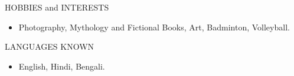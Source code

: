 \documentclass{resume} %
\begin{document}

\begin{rSection}{HOBBIES and INTERESTS} 
\begin{itemize}
    \item 	Photography, Mythology and Fictional Books, Art, Badminton, Volleyball.
\end{itemize}
\end{rSection}

\begin{rSection}{LANGUAGES KNOWN} 
\begin{itemize}
    \item English, Hindi, Bengali.
\end{itemize}
\end{rSection}

\end{document}
